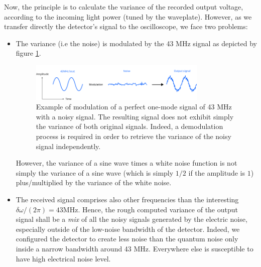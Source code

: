 \documentclass[11pt]{report}
\begin{document}
Now, the principle is to calculate the variance of the recorded output voltage, according to the incoming light power (tuned by the waveplate). However, as we transfer directly the detector's signal to the oscilloscope, we face two problems:
\begin{itemize}
	\item The variance (i.e the noise) is modulated by the 43 MHz signal as depicted by figure \ref{fig:beatnoise}.
	
	\begin{figure}[h!]
	\centering
	\includegraphics[width=0.8\textwidth]{beatnoise}
	\caption{Example of modulation of a perfect one-mode signal of 43 MHz with a noisy signal. The resulting signal does not exhibit simply the variance of both original signals. Indeed, a demodulation process is required in order to retrieve the variance of the noisy signal independently.}
	\label{fig:beatnoise}
	\end{figure}
	
	However, the variance of a sine wave times a white noise function is not simply the variance of a sine wave (which is simply $1/2$ if the amplitude is $1$) plus/multiplied by the variance of the white noise.
	\item The received signal comprises also other frequencies than the interesting $\delta\omega/(2\pi) = 43$MHz. Hence, the rough computed variance of the output signal shall be a \textit{mix} of all the noisy signals generated by the electric noise, especially outside of the low-noise bandwidth of the detector. Indeed, we configured the detector to create less noise than the quantum noise only inside a narrow bandwidth around 43 MHz. Everywhere else is susceptible to have high electrical noise level.
\end{itemize}
\end{document}
